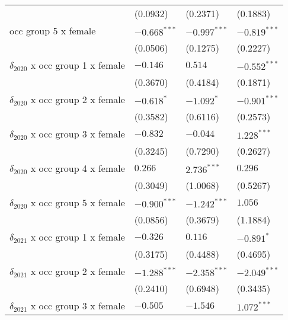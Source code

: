 \begin{tabular}{llll}
                                       &           (0.0932) &           (0.2371) &           (0.1883) \\
occ group 5 x female                   &     $-0.668^{***}$ &     $-0.997^{***}$ &     $-0.819^{***}$ \\
                                       &           (0.0506) &           (0.1275) &           (0.2227) \\
$\delta_{2020}$ x occ group 1 x female &           $-0.146$ &            $0.514$ &     $-0.552^{***}$ \\
                                       &           (0.3670) &           (0.4184) &           (0.1871) \\
$\delta_{2020}$ x occ group 2 x female &         $-0.618^*$ &         $-1.092^*$ &     $-0.901^{***}$ \\
                                       &           (0.3582) &           (0.6116) &           (0.2573) \\
$\delta_{2020}$ x occ group 3 x female &           $-0.832$ &           $-0.044$ &      $1.228^{***}$ \\
                                       &           (0.3245) &           (0.7290) &           (0.2627) \\
$\delta_{2020}$ x occ group 4 x female &            $0.266$ &      $2.736^{***}$ &            $0.296$ \\
                                       &           (0.3049) &           (1.0068) &           (0.5267) \\
$\delta_{2020}$ x occ group 5 x female &     $-0.900^{***}$ &     $-1.242^{***}$ &            $1.056$ \\
                                       &           (0.0856) &           (0.3679) &           (1.1884) \\
$\delta_{2021}$ x occ group 1 x female &           $-0.326$ &            $0.116$ &         $-0.891^*$ \\
                                       &           (0.3175) &           (0.4488) &           (0.4695) \\
$\delta_{2021}$ x occ group 2 x female &     $-1.288^{***}$ &     $-2.358^{***}$ &     $-2.049^{***}$ \\
                                       &           (0.2410) &           (0.6948) &           (0.3435) \\
$\delta_{2021}$ x occ group 3 x female &           $-0.505$ &           $-1.546$ &      $1.072^{***}$ \\

\end{tabular}
